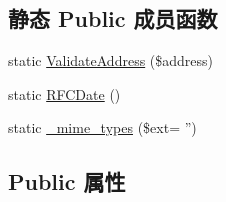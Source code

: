\subsection*{静态 Public 成员函数}
\begin{DoxyCompactItemize}
\item 
static \hyperlink{classPHPMailer_a67c7355dffd0b46878c2a0cea6dfcb80}{Validate\+Address} (\$address)
\item 
static \hyperlink{classPHPMailer_ae3943e2e54c83720c42c5f0414466836}{R\+F\+C\+Date} ()
\item 
static \hyperlink{classPHPMailer_a8d2fb441ebefa49645d44f5f5a5fb751}{\+\_\+mime\+\_\+types} (\$ext= '')
\end{DoxyCompactItemize}
\subsection*{Public 属性}
